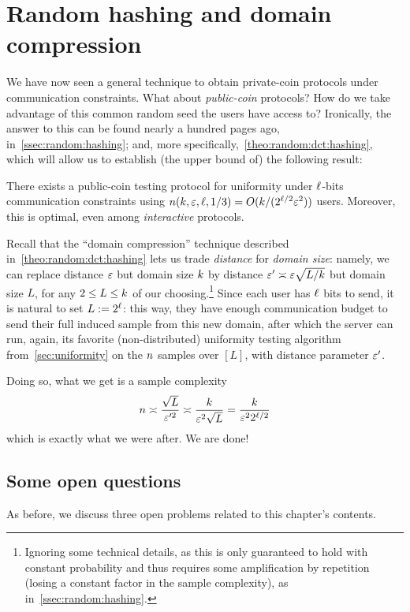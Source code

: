 \section{Random hashing and domain compression}
  \label{sec:domain:compression}
We have now seen a general technique to obtain private-coin protocols under communication constraints. What about \emph{public-coin} protocols? How do we take advantage of this common random seed the users have access to? Ironically, the answer to this can be found nearly a hundred pages ago, in~\cref{ssec:random:hashing}; and, more specifically,~\cref{theo:random:dct:hashing}, which will allow us to establish (the upper bound of) the following result:
\begin{theorem}
  \label{theo:public-coin}
There exists a public-coin testing protocol for uniformity under $\ell$-bits communication constraints using $n(k,\varepsilon,\ell, 1/3) = O(k/(2^{\ell/2} \varepsilon^2))$ users. Moreover, this is optimal, even among \emph{interactive} protocols.
\end{theorem}
Recall that the ``domain compression'' technique described in~\cref{theo:random:dct:hashing} lets us trade \emph{distance} for \emph{domain size}: namely, we can replace distance $\varepsilon$ but domain size $k$ by
distance $\varepsilon'\asymp\varepsilon\sqrt{L/k}$ but domain size $L$, for any $2\leq L\leq k$ of our choosing.\footnote{Ignoring some technical details, as this is only guaranteed to hold with constant probability and thus requires some amplification by repetition (losing a constant factor in the sample complexity), as in~\cref{ssec:random:hashing}.} Since each user has $\ell$ bits to send, it is natural to set $L := 2^\ell$: this way, they have enough communication budget to send their full induced sample from this new domain, after which the server can run, again, its favorite (non-distributed) uniformity testing algorithm from~\cref{sec:uniformity} on the $n$ samples over $[L]$, with distance parameter $\varepsilon'$.

\noindent Doing so, what we get is a sample complexity
\begin{equation}
	n \asymp \frac{\sqrt{L}}{\varepsilon'^2} \asymp \frac{k}{\varepsilon^2 \sqrt{L}} = \frac{k}{\varepsilon^22^{\ell/2}}
\end{equation}
which is exactly what we were after. We are done!
\subsection{Some open questions}
As before, we discuss three open problems related to this chapter's contents.

